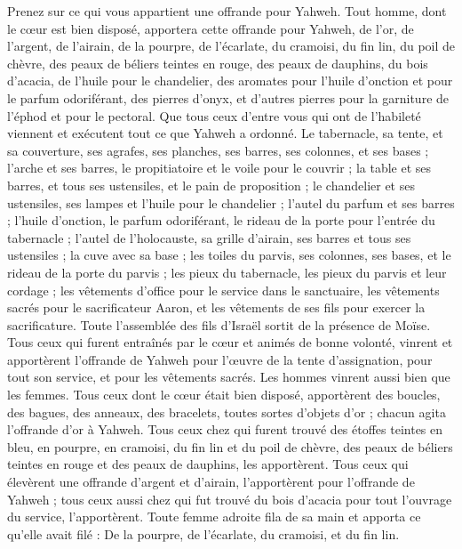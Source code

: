 \begin{multicols}{2}
Prenez sur ce qui vous appartient une offrande pour Yahweh. Tout homme, dont le cœur est bien disposé, apportera cette offrande pour Yahweh, de l'or, de l'argent, de l'airain,
de la pourpre, de l'écarlate, du cramoisi, du fin lin, du poil de chèvre,
des peaux de béliers teintes en rouge, des peaux de dauphins, du bois d’acacia,
de l'huile pour le chandelier, des aromates pour l'huile d'onction et pour le parfum odoriférant,
des pierres d'onyx, et d’autres pierres pour la garniture de l'éphod et pour le pectoral.
Que tous ceux d’entre vous qui ont de l’habileté viennent et exécutent tout ce que Yahweh a ordonné.
Le tabernacle, sa tente, et sa couverture, ses agrafes, ses planches, ses barres, ses colonnes, et ses bases ;
l'arche et ses barres, le propitiatoire et le voile pour le couvrir ;
la table et ses barres, et tous ses ustensiles, et le pain de proposition ;
le chandelier et ses ustensiles, ses lampes et l'huile pour le chandelier ;
l'autel du parfum et ses barres ; l'huile d'onction, le parfum odoriférant, le rideau de la porte pour l'entrée du tabernacle ;
l'autel de l'holocauste, sa grille d'airain, ses barres et tous ses ustensiles ; la cuve avec sa base ;
les toiles du parvis, ses colonnes, ses bases, et le rideau de la porte du parvis ;
les pieux du tabernacle, les pieux du parvis et leur cordage ;
les vêtements d’office pour le service dans le sanctuaire, les vêtements sacrés pour le sacrificateur Aaron, et les vêtements de ses fils pour exercer la sacrificature.
Toute l'assemblée des fils d'Israël sortit de la présence de Moïse.
Tous ceux qui furent entraînés par le cœur et animés de bonne volonté, vinrent et apportèrent l'offrande de Yahweh pour l’œuvre de la tente d'assignation, pour tout son service, et pour les vêtements sacrés.
Les hommes vinrent aussi bien que les femmes. Tous ceux dont le cœur était bien disposé, apportèrent des boucles, des bagues, des anneaux, des bracelets, toutes sortes d’objets d'or ; chacun agita l’offrande d'or à Yahweh.
Tous ceux chez qui furent trouvé des étoffes teintes en bleu, en pourpre, en cramoisi, du fin lin et du poil de chèvre, des peaux de béliers teintes en rouge et des peaux de dauphins, les apportèrent.
Tous ceux qui élevèrent une offrande d'argent et d'airain, l’apportèrent pour l'offrande de Yahweh ; tous ceux aussi chez qui fut trouvé du bois d’acacia pour tout l'ouvrage du service, l'apportèrent.
Toute femme adroite fila de sa main et apporta ce qu'elle avait filé : De la pourpre, de l'écarlate, du cramoisi, et du fin lin.

\end{multicols}
